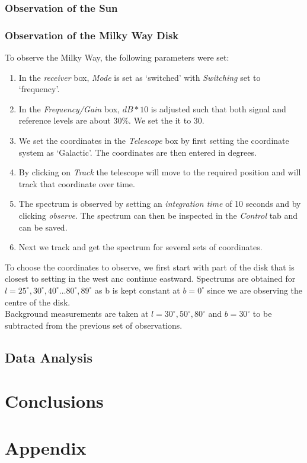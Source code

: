 \documentclass[12pt,a4paper]{article}
\begin{document}
        \subsubsection{Observation of the Sun}
        \subsubsection{Observation of the Milky Way Disk}
            To observe the Milky Way, the following parameters were set:
            \begin{enumerate}
                \item In the \textit{receiver} box, \textit{Mode} is set as `switched' with \textit{Switching} set to `frequency'.
                \item In the \textit{Frequency/Gain} box, $dB*10$ is adjusted such that both signal and reference levels are about $30\%$. We set the it to 30.
                \item We set the coordinates in the \textit{Telescope} box by first setting the coordinate system as `Galactic'. The coordinates are then entered in degrees.
                \item By clicking on \textit{Track} the telescope will move to the required position and will track that coordinate over time.
                \item The spectrum is observed by setting an \textit{integration time} of 10 seconds and by clicking \textit{observe}. The spectrum can then be inspected in the \textit{Control} tab and can be saved.
                \item Next we track and get the spectrum for several sets of coordinates. 
            \end{enumerate}
            
            To choose the coordinates to observe, we first start with part of the disk that is closest to setting in the west anc continue eastward. Spectrums are obtained for $l=25^\circ,30^\circ,40^\circ \dots 80^\circ, 89^\circ$ as b is kept constant at $b=0^\circ$ since we are observing the centre of the disk. \\

            Background measurements are taken at $l=30^\circ,50^\circ,80^\circ$ and $b=30^\circ$ to be subtracted from the previous set of observations.

    \subsection{Data Analysis}
    \label{sec:data_analysis}

\section{Conclusions}

\printbibliography     
\appendix
\section{Appendix}
\end{document}
